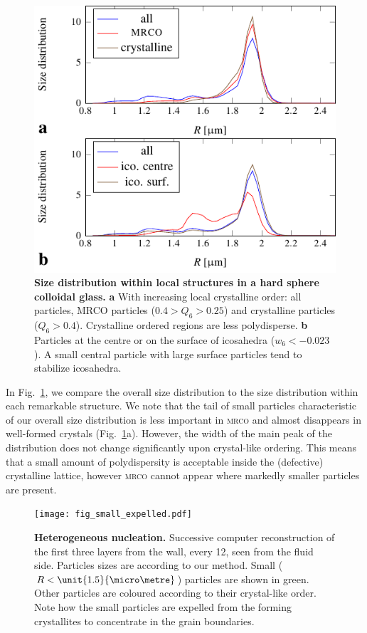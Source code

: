 \documentclass[8.5pt,twoside,twocolumn]{article}
\begin{document}
\begin{figure}
	\centering
	\includegraphics{fig_size_struc.pdf}
	\caption{\textbf{Size distribution within local structures in a hard sphere colloidal glass.} \textbf{a} With increasing local crystalline order: all particles, MRCO particles ($0.4>Q_6>0.25$) and crystalline particles ($Q_6>0.4$). Crystalline ordered regions are less polydisperse. \textbf{b} Particles at the centre or on the surface of icosahedra ($w_6<-0.023$). A small central particle with large surface particles tend to stabilize icosahedra.}
	\label{fig:size_struc}
\end{figure}

In Fig.~\ref{fig:size_struc}, we compare the overall size distribution to the size distribution within each remarkable structure. We note that the tail of small particles characteristic of our overall size distribution is less important in \textsc{mrco} and almost disappears in well-formed crystals (Fig.~\ref{fig:size_struc}a). However, the width of the main peak of the distribution does not change significantly upon crystal-like ordering. This means that a small amount of polydispersity is acceptable inside the (defective) crystalline lattice, however \textsc{mrco} cannot appear where markedly smaller particles are present.

\begin{figure}
	\centering
	\texttt{[image: fig\_small\_expelled.pdf]}
	\caption{\textbf{Heterogeneous nucleation.} Successive computer reconstruction of the first three layers from the wall, every \unit{12}{\hour}, seen from the fluid side. Particles sizes are according to our method. Small ($R<\unit{1.5}{\micro\metre}$) particles are shown in green. Other particles are coloured according to their crystal-like order. Note how the small particles are expelled from the forming crystallites to concentrate in the grain boundaries.}
	\label{fig:small_expelled}
\end{figure}
\end{document}
